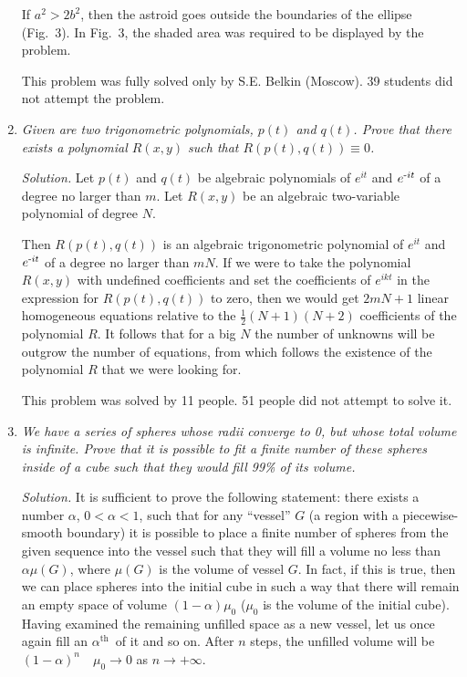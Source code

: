 \documentclass[12pt]{amsart}
\renewcommand{\th}{$^\text{th}$~}
\begin{document}
\begin{enumerate}
If $a^2>2b^2$, then the astroid goes outside the boundaries of the ellipse
(Fig.~3).
In Fig.~3, the shaded area was required to be displayed by the problem.

This problem was fully solved only by S.E. Belkin (Moscow).
39 students did not attempt the problem.
\item
\textit{Given are two trigonometric polynomials, $p(t)$ and $q(t)$.
Prove that there exists a polynomial $R(x,y)$ such that $R(p(t),q(t))\equiv0$.}

\textit{Solution.}
Let $p(t)$ and $q(t)$ be algebraic polynomials of $e^{it}$ and $e^{\text-it}$
of a degree no larger than $m$.
Let $R(x,y)$ be an algebraic two-variable polynomial of degree $N$.

Then $R(p(t),q(t))$ is an algebraic trigonometric polynomial of $e^{it}$ and
$e^{\text-it}$ of a degree no larger than $mN$.
If we were to take the polynomial $R(x,y)$ with undefined coefficients and set
the coefficients of $e^{ikt}$ in the expression for $R(p(t),q(t))$ to zero, then
we would get $2mN+1$ linear homogeneous equations relative to the
$\displaystyle\frac12(N+1)(N+2)$ coefficients of the polynomial $R$.
It follows that for a big $N$ the number of unknowns will be outgrow the number
of equations, from which follows the existence of the polynomial $R$ that we
were looking for.

This problem was solved by 11 people.
51 people did not attempt to solve it.
\item
\textit{We have a series of spheres whose radii converge to 0, but whose total
volume is infinite.
Prove that it is possible to fit a finite number of these spheres inside of a
cube such that they would fill 99\% of its volume.}

\textit{Solution.}
It is sufficient to prove the following statement: there exists a number
$\alpha$, $0<\alpha<1$, such that for any ``vessel'' $G$ (a region with a
piecewise-smooth boundary) it is possible to place a finite number of spheres
from the given sequence into the vessel such that they will fill a volume no
less than $\alpha\mu(G)$, where $\mu(G)$ is the volume of vessel $G$.
In fact, if this is true, then we can place spheres into the initial cube in
such a way that there will remain an empty space of volume $(1-\alpha)\mu_0$
($\mu_0$ is the volume of the initial cube).
Having examined the remaining unfilled space as a new vessel, let us once again
fill an $\alpha$\th of it and so on.
After $n$ steps, the unfilled volume will be $(1-\alpha)^n\quad\mu_0\to0$ as
$n\to+\infty$.


\end{enumerate}
\end{document}
